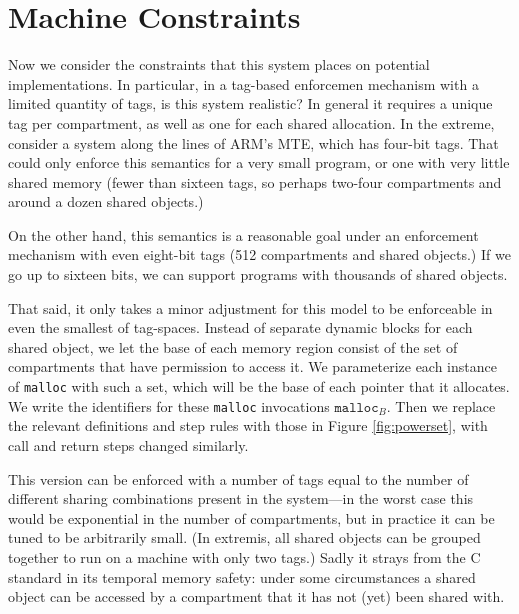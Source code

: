 \documentclass{article}
\begin{document}
\section{Machine Constraints}

Now we consider the constraints that this system places on potential implementations.
In particular, in a tag-based enforcemen mechanism with a limited quantity of tags,
is this system realistic? In general it requires a unique tag per compartment,
as well as one for each shared allocation. In the extreme, consider a system along
the lines of ARM's MTE, which has four-bit tags. That could only enforce this
semantics for a very small program, or one with very little shared memory (fewer than sixteen tags, so perhaps two-four compartments and around a dozen shared objects.)

On the other hand, this semantics is a reasonable goal under an enforcement mechanism
with even eight-bit tags (512 compartments and shared objects.) If we go up to sixteen
bits, we can support programs with thousands of shared objects.

That said, it only takes a minor adjustment for this model to be enforceable in even
the smallest of tag-spaces. Instead of separate dynamic blocks for each shared
object, we let the base of each memory region consist of the set of compartments
that have permission to access it. We parameterize each instance of {\tt malloc}
with such a set, which will be the base of each pointer that it allocates. We write
the identifiers for these {\tt malloc} invocations \(\mathtt{malloc}_B\).
Then we replace the relevant definitions and step rules with those in
Figure \ref{fig:powerset}, with call and return steps changed similarly.

This version can be enforced with a number of tags equal to the number of different
sharing combinations present in the system---in the worst case this would be
exponential in the number of compartments, but in practice it can be tuned to be
arbitrarily small. (In extremis, all shared objects can be grouped together to run
on a machine with only two tags.) Sadly it strays from the C standard in its
temporal memory safety: under some circumstances a shared object can be accessed
by a compartment that it has not (yet) been shared with.
\end{document}
